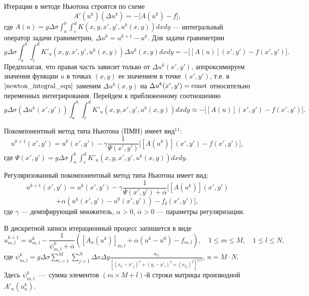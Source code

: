 \documentclass[%
autoref,     %
href,        %
colorlinks,  %
]{disser}
\begin{document}
	Итерации в методе Ньютона строятся по схеме
$$A'(u^k)(\Delta u^k)=-\big[A(u^k)-f\big],$$ где $A(u)=g\Delta\sigma\int_{a}^{b}\int_{c}^{d}K(x,y, x',y',u^k(x,y))dxdy$ --- интегральный оператор задачи гравиметрии, $\Delta u^k=u^{k+1}-u^k$.
Для задачи гравиметрии
\begin{equation}\label{newton_integral_equ}
	g\Delta\sigma\int_{a}^{b}\int_{c}^{d}K'_u(x,y, x',y',u^k(x,y))\Delta u^k(x,y) dxdy=-\big[[A(u)](x',y')-f(x',y')\big].
\end{equation}
Предполагая, что правая часть зависит только от $\Delta u^k(x',y')$, аппроксимируем значения функции $u$ в точках $(x,y)$ ее значением в точке $(x',y')$, т.е. в $\eqref{newton_integral_equ}$ заменим  
$\Delta u^k(x,y)$ на $\Delta u^k(x',y')=\textnormal{const}$ относительно переменных интегрирования. Перейдем к приближенному соотношению
$$g\Delta\sigma(\Delta u^k(x',y'))\int_{a}^{b}\int_{c}^{d}K'_u(x,y, x',y',u^k(x,y)) dxdy\approx -\big[[A(u)](x',y')-f(x',y')\big].$$


Покомпонентный метод типа Ньютона (ПМН) имеет вид$^{11}$:
$$u^{k+1}(x',y')=u^k(x',y')-\gamma\frac{1}{\varPsi(x',y')}\big[[A(u^k)](x',y')-f(x',y')\big],$$
где $\varPsi(x',y')=g\Delta\sigma\int_{a}^{b}\int_{c}^{d}K'_u(x,y, x',y',u^k(x,y)) dxdy.$

Регуляризованный покомпонентный метод типа Ньютона имеет вид:
$$u^{k+1}(x',y')=u^k(x',y')-\gamma\frac{1}{\varPsi(x',y')+\bar{\alpha}}\big[[A(u^k)](x',y')$$ 
$$+\alpha (u^k(x',y')-u^0(x',y'))-f_\delta(x',y')\big],$$
где $\gamma$ --- демпфирующий множитель, $\alpha>0$, $\bar{\alpha} >0$ --- параметры регуляризации.

В дискретной записи итерационный процесс запишется в виде
$$u_{m,l}^{k+1}=u_{m,l}^k-\frac{1}{\psi_{m,l}^k+\bar\alpha}([A_n(u^k)]_{m,l} + \alpha(u^k-u^0) -f_{m,l}),\quad 1\le m \le M, \quad 1\le l \le N,$$
{\scriptsize
	\let\thefootnote\relax\let\thefootnote\relax{}
}
где $\psi_{m,l}^k=g\Delta\sigma\sum\limits_{i=1}^{M}\sum\limits_{j=1}^{N}
\Delta x\Delta y\frac{u_{ij}}{[(x_k-x'_j)^2+(y_l-y'_i)^2+(u_{ij})^2]^{3/2}}$, $n=M\cdot N$.
Здесь $\psi_{m,l}^k$~---~сумма элементов $(m\times M + l)$-й строки матрицы производной $A'_n(u_n^k)$. 
\end{document}
